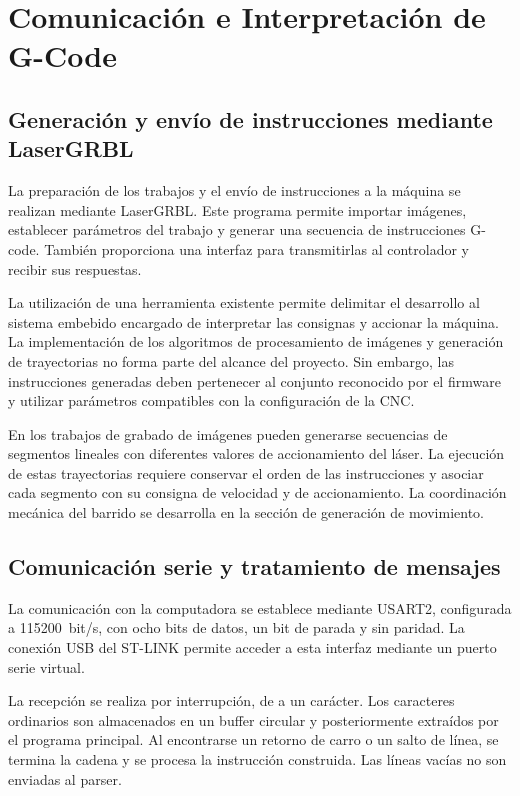 \documentclass[blue,fullpaper]{ludusofficial}  %
\begin{document}
\section{Comunicación e Interpretación de G-Code}

\subsection{Generación y envío de instrucciones mediante LaserGRBL}

La preparación de los trabajos y el envío de instrucciones
a la máquina se realizan mediante LaserGRBL. Este programa
permite importar imágenes, establecer parámetros del trabajo
y generar una secuencia de instrucciones G-code. También
proporciona una interfaz para transmitirlas al controlador
y recibir sus respuestas.

La utilización de una herramienta existente permite
delimitar el desarrollo al sistema embebido encargado
de interpretar las consignas y accionar la máquina.
La implementación de los algoritmos de procesamiento
de imágenes y generación de trayectorias no forma parte
del alcance del proyecto. Sin embargo, las instrucciones
generadas deben pertenecer al conjunto reconocido por
el firmware y utilizar parámetros compatibles con
la configuración de la CNC.

En los trabajos de grabado de imágenes pueden generarse
secuencias de segmentos lineales con diferentes valores
de accionamiento del láser. La ejecución de estas
trayectorias requiere conservar el orden de las instrucciones
y asociar cada segmento con su consigna de velocidad
y de accionamiento. La coordinación mecánica del barrido
se desarrolla en la sección de generación de movimiento.

\subsection{Comunicación serie y tratamiento de mensajes}

La comunicación con la computadora se establece mediante
USART2, configurada a 115200~bit/s, con ocho bits de datos,
un bit de parada y sin paridad. La conexión USB del ST-LINK
permite acceder a esta interfaz mediante un puerto
serie virtual.

La recepción se realiza por interrupción, de a un carácter.
Los caracteres ordinarios son almacenados en un buffer
circular y posteriormente extraídos por el programa
principal. Al encontrarse un retorno de carro o un salto
de línea, se termina la cadena y se procesa la instrucción
construida. Las líneas vacías no son enviadas al parser.
\end{document}
